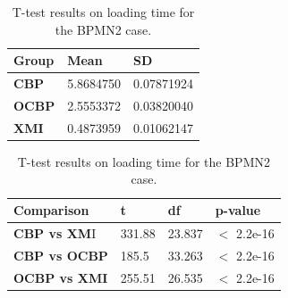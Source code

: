 \documentclass{llncs}
\begin{document}
\begin{table}[ht]
\centering
\label{table:ttest_load_time_bpmn2}
\caption{T-test results on loading time for the BPMN2 case.}
\begin{minipage}{0.44\textwidth}
    \centering
        \begin{tabular}{|p{}|p{}|p{}|}
            \hline 
            \textbf{Group}  & \textbf{Mean} & \textbf{SD} \\ 
            \hline 
            \textbf{CBP} & 5.8684750   &0.07871924 \\ 
            \hline 
            \textbf{OCBP} & 2.5553372  & 0.03820040  \\ 
            \hline 
            \textbf{XMI} & 0.4873959   & 0.01062147\\ 
            \hline 
        \end{tabular} 
\end{minipage}
\hfill
\begin{minipage}{0.54\textwidth}
    \centering
    \begin{tabular}{|p{}|p{}|p{}|p{}|}
        \hline 
        \textbf{Comparison} & \textbf{t}  & \textbf{df} & \textbf{p-value} \\ 
        \hline 
        \textbf{CBP vs XM}I & 331.88    &23.837 & $<$ 2.2e-16 \\ 
        \hline 
        \textbf{CBP vs OCBP} & 185.5 & 33.263  & $<$ 2.2e-16 \\ 
        \hline 
        \textbf{OCBP vs XMI} & 255.51    & 26.535  & $<$ 2.2e-16 \\ 
        \hline 
    \end{tabular} 
\end{minipage}
\end{table}
\end{document}
